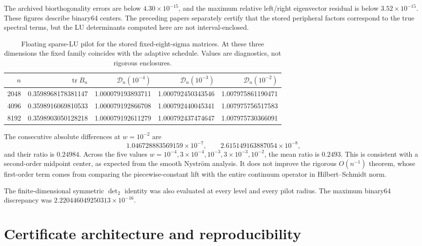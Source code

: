 \documentclass[11pt]{article}
\theoremstyle{definition}
\theoremstyle{remark}
\newcommand{\cD}{\mathcal D}
\newcommand{\tr}{\operatorname{tr}}
\begin{document}
The archived biorthogonality errors are below
$4.30\times10^{-15}$, and the maximum relative left/right eigenvector
residual is below $3.52\times10^{-15}$.  These figures describe binary64
centers.  The preceding papers separately certify that the stored
peripheral factors correspond to the true spectral terms, but the LU
determinants computed here are not interval-enclosed.

\begin{table}[H]
\centering
\small
\begin{tabular}{rrrrr}
\toprule
$n$ & $\tr B_n$ & $\cD_n(10^{-4})$ & $\cD_n(10^{-3})$
& $\cD_n(10^{-2})$\\
\midrule
2048 & 0.3598968178381147 & 1.000079193893711
& 1.000792450343546 & 1.007975861190471\\
4096 & 0.3598916069810533 & 1.000079192866708
& 1.000792440045341 & 1.007975756517583\\
8192 & 0.3598903050128218 & 1.000079192611279
& 1.000792437474647 & 1.007975730366091\\
\bottomrule
\end{tabular}
\caption{Floating sparse-LU pilot for the stored fixed-eight-sigma matrices.
At these three dimensions the fixed family coincides with the adaptive
schedule.  Values are diagnostics, not rigorous enclosures.}
\label{tab:pilot-values}
\end{table}

The consecutive absolute differences at $w=10^{-2}$ are
\begin{equation}
 1.046728883569159\times10^{-7},
 \qquad
 2.615149163887054\times10^{-8},
 \label{eq:pilot-differences}
\end{equation}
and their ratio is $0.24984$.  Across the five values
$w=10^{-4},3\times10^{-4},10^{-3},3\times10^{-3},10^{-2}$, the mean ratio
is $0.2493$.  This is consistent with a second-order midpoint center, as
expected from the smooth Nystr\"om analysis.  It does not improve the
rigorous $O(n^{-1})$ theorem, whose first-order term comes from comparing
the piecewise-constant lift with the entire continuum operator in
Hilbert--Schmidt norm.

The finite-dimensional symmetric $\det_2$ identity was also evaluated at
every level and every pilot radius.  The maximum binary64 discrepancy was
$2.220446049250313\times10^{-16}$.

\section{Certificate architecture and reproducibility}
\label{sec:certificate}
\end{document}
